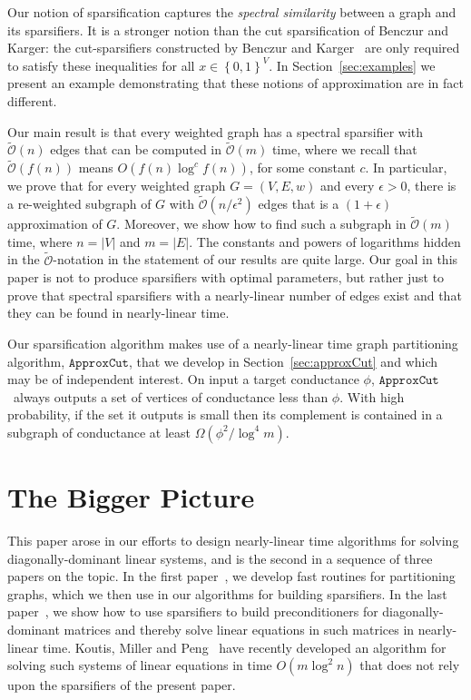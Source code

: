 \documentclass[11pt]{article}
\newcommand{\approxcut}{\ensuremath{\mathtt{ApproxCut}}}
\def\softO#1{\widetilde{\mathcal{O}} \left( #1 \right)}
\def\setof#1{\left\{#1  \right\}}
\def\sizeof#1{\left|#1  \right|}
\def\setof#1{\left\{#1  \right\}}
\begin{document}
Our notion of sparsification captures the {\em spectral similarity}
  between a graph and its sparsifiers.
It is  a stronger notion than the
  cut sparsification of Benczur and Karger:
 the cut-sparsifiers constructed by Benczur and Karger~\cite{BenczurKarger}
  are only required to satisfy these inequalities for all $x \in \setof{0,1}^{V}$.
In Section~\ref{sec:examples} we present an example demonstrating that these notions
  of approximation are in fact different.


Our main result is
  that every weighted graph has a spectral sparsifier with
  $\softO{n}$ edges that can be computed in
  $\softO{m}$ time,
 where we recall that
  $\softO{f (n)}$
  means $O (f (n) \log^{c} f (n))$, for some constant $c$.
In particular, we prove that for every weighted graph $G = (V,E,w)$ and every
  $\epsilon > 0$, there is a re-weighted subgraph of $G$ with $\softO{n / \epsilon^{2}}$ edges
  that is a $(1+\epsilon)$ approximation of $G$.
Moreover, we show how to  find such
  a subgraph in $\softO{m}$ time, where $n = \sizeof{V}$ and $m = \sizeof{E}$.
The constants and powers of logarithms
  hidden in the $\widetilde{\mathcal{O}}$-notation
  in the statement of our results are quite large.
Our goal in this paper is not to produce sparsifiers with optimal parameters, but
  rather just to prove
  that spectral sparsifiers with a nearly-linear number of edges exist and
  that they can be found in nearly-linear time.

Our sparsification algorithm makes use of a nearly-linear time
  graph partitioning algorithm, \approxcut ,  that we develop in Section~\ref{sec:approxCut} and which may be of independent interest.
On input a target conductance $\phi$, \approxcut \ always outputs a set of vertices
  of conductance less than $\phi$.
With high probability, if the set it outputs is small then its complement
 is contained in a subgraph of conductance at least $\Omega (\phi^{2} / \log^{4} m)$.

\section{The Bigger Picture}

This paper arose in our efforts to design nearly-linear time algorithms
  for solving diagonally-dominant linear systems, and is the second in
  a sequence of three papers on the topic.
In the first paper~\cite{SpielmanTengCuts}, we develop fast routines
  for partitioning graphs, which we then use in our algorithms for building
  sparsifiers.
In the last paper~\cite{SpielmanTengLinsolve}, we show how to use
  sparsifiers to build preconditioners for diagonally-dominant matrices
  and thereby solve linear equations in such matrices in nearly-linear time.
Koutis, Miller and Peng~\cite{KMP} have recently developed an algorithm for
  solving such systems 
  of linear equations in time $O (m \log^{2} n)$
  that does not rely upon the sparsifiers of the present paper.
\end{document}
